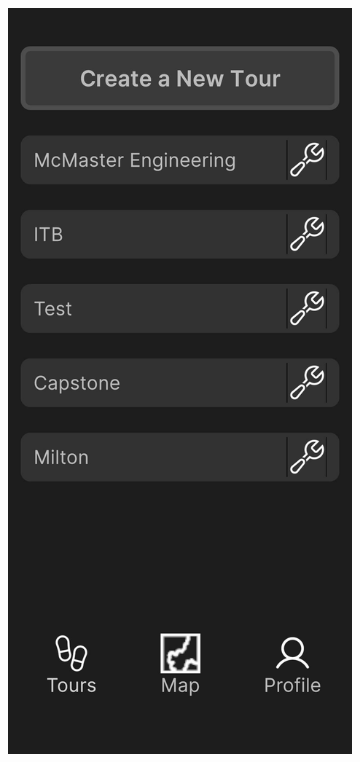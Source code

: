 \documentclass[12pt, titlepage]{article}
\begin{document}
\begin{figure}[ht!]
    \centering
    \begin{subfigure}[b]{0.48\textwidth}
        \centering
        \includegraphics[width=\textwidth]{tour_screen.png}

\end{subfigure}
\end{figure}
\end{document}
